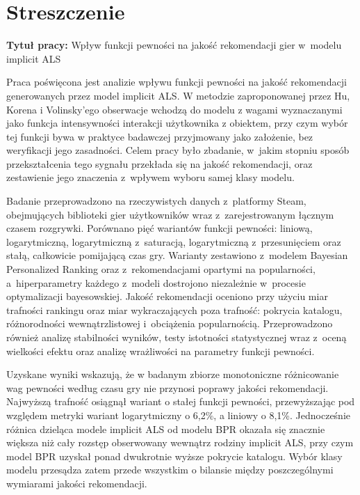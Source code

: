 \chapter*{Streszczenie}

\noindent\textbf{Tytuł pracy:} Wpływ funkcji pewności na jakość rekomendacji gier w~modelu implicit ALS

\vspace{0.8em}

Praca poświęcona jest analizie wpływu funkcji pewności na jakość rekomendacji generowanych przez model implicit ALS. W metodzie zaproponowanej przez Hu, Korena i Volinsky'ego obserwacje wchodzą do modelu z wagami wyznaczanymi jako funkcja intensywności interakcji użytkownika z obiektem, przy czym wybór tej funkcji bywa w praktyce badawczej przyjmowany jako założenie, bez weryfikacji jego zasadności. Celem pracy było zbadanie, w~jakim stopniu sposób przekształcenia tego sygnału przekłada się na jakość rekomendacji, oraz zestawienie jego znaczenia z~wpływem wyboru samej klasy modelu.

Badanie przeprowadzono na rzeczywistych danych z~platformy Steam, obejmujących biblioteki gier użytkowników wraz z~zarejestrowanym łącznym czasem rozgrywki. Porównano pięć wariantów funkcji pewności: liniową, logarytmiczną, logarytmiczną z~saturacją, logarytmiczną z~przesunięciem oraz stałą, całkowicie pomijającą czas gry. Warianty zestawiono z~modelem Bayesian Personalized Ranking oraz z~rekomendacjami opartymi na popularności, a~hiperparametry każdego z~modeli dostrojono niezależnie w~procesie optymalizacji bayesowskiej. Jakość rekomendacji oceniono przy użyciu miar trafności rankingu oraz miar wykraczających poza trafność: pokrycia katalogu, różnorodności wewnątrzlistowej i~obciążenia popularnością. Przeprowadzono również analizę stabilności wyników, testy istotności statystycznej wraz z~oceną wielkości efektu oraz analizę wrażliwości na parametry funkcji pewności.

Uzyskane wyniki wskazują, że w badanym zbiorze monotoniczne różnicowanie wag pewności według czasu gry nie przynosi poprawy jakości rekomendacji. Najwyższą trafność osiągnął wariant o stałej funkcji pewności, przewyższając pod względem metryki \ndcg{} wariant logarytmiczny o 6,2\%, a liniowy o 8,1\%. Jednocześnie różnica dzieląca modele implicit ALS od modelu BPR okazała się znacznie większa niż cały rozstęp obserwowany wewnątrz rodziny implicit ALS, przy czym model BPR uzyskał ponad dwukrotnie wyższe pokrycie katalogu. Wybór klasy modelu przesądza zatem przede wszystkim o bilansie między poszczególnymi wymiarami jakości rekomendacji.

